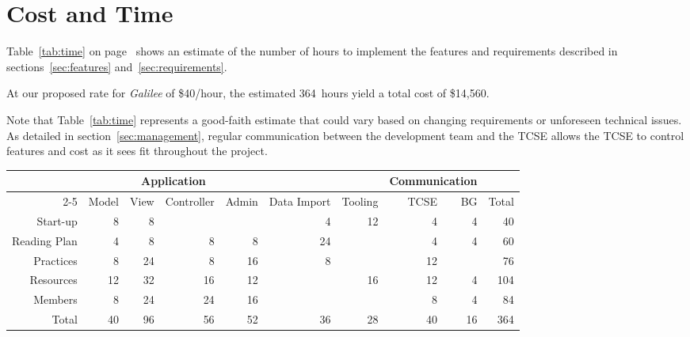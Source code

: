 \documentclass{article}
\newcommand{\gal}{\emph{Galilee}}
\newcommand{\tcse}{TCSE}
\begin{document}
\section{Cost and Time}
\label{sec:cost-time}

Table~\ref{tab:time} on page~\pageref{tab:time} shows
an estimate of the number of hours to implement
the features and requirements described in
sections~\ref{sec:features} and~\ref{sec:requirements}.

At our proposed rate for \gal{} of \$40/hour,
the estimated 364~hours yield
a total cost of \$14,560.

Note that Table~\ref{tab:time}
represents a good-faith estimate
that could vary
based on changing requirements
or unforeseen technical issues.
As detailed in section~\ref{sec:management},
regular communication
between the development team and the \tcse{}
allows the \tcse{} to control features and cost
as it sees fit throughout the project.

\begin{sidewaystable}
  \centering
  \begin{tabular}{rrrrrrrrrr}
    \toprule
                 & \multicolumn{4}{c}{Application} & & & \multicolumn{2}{c}{Communication} & \\
    \cmidrule{2-5}
    \cmidrule{8-9}
                 & Model & View & Controller & Admin & Data Import & Tooling & TCSE & BG & Total \\
    Start-up     & 8     & 8    &            &       & 4           & 12      & 4    & 4  & 40    \\
    Reading Plan & 4     & 8    & 8          & 8     & 24          &         & 4    & 4  & 60    \\
    Practices    & 8     & 24   & 8          & 16    & 8           &         & 12   &    & 76    \\
    Resources    & 12    & 32   & 16         & 12    &             & 16      & 12   & 4  & 104   \\
    Members      & 8     & 24   & 24         & 16    &             &         & 8    & 4  & 84    \\
    \addlinespace
    Total        & 40    & 96   & 56         & 52    & 36          & 28      & 40   & 16 & 364   \\
    \bottomrule
  \end{tabular}
  \caption{Time estimate for \gal{} (hours)}
  \label{tab:time}
\end{sidewaystable}

\appendix
\end{document}
